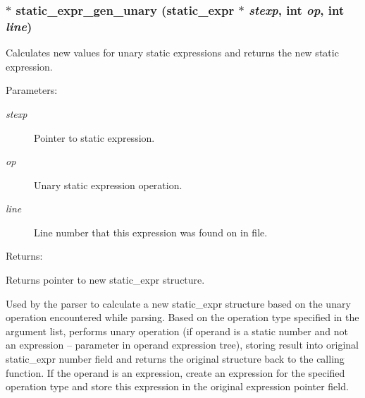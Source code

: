 \subsubsection{$\ast$ static\_\-expr\_\-gen\_\-unary ({\bf static\_\-expr} $\ast$ {\em stexp}, int {\em op}, int {\em line})}\label{static_8c_a0}


Calculates new values for unary static expressions and returns the new static expression.

\begin{Desc}
\item[Parameters: ]\par
\begin{description}
\item[{\em 
stexp}]Pointer to static expression. \item[{\em 
op}]Unary static expression operation. \item[{\em 
line}]Line number that this expression was found on in file.\end{description}
\end{Desc}
\begin{Desc}
\item[Returns: ]\par
Returns pointer to new static\_\-expr structure.\end{Desc}
Used by the parser to calculate a new static\_\-expr structure based on the unary operation encountered while parsing. Based on the operation type specified in the argument list, performs unary operation (if operand is a static number and not an expression -- parameter in operand expression tree), storing result into original static\_\-expr number field and returns the original structure back to the calling function. If the operand is an expression, create an expression for the specified operation type and store this expression in the original expression pointer field. 